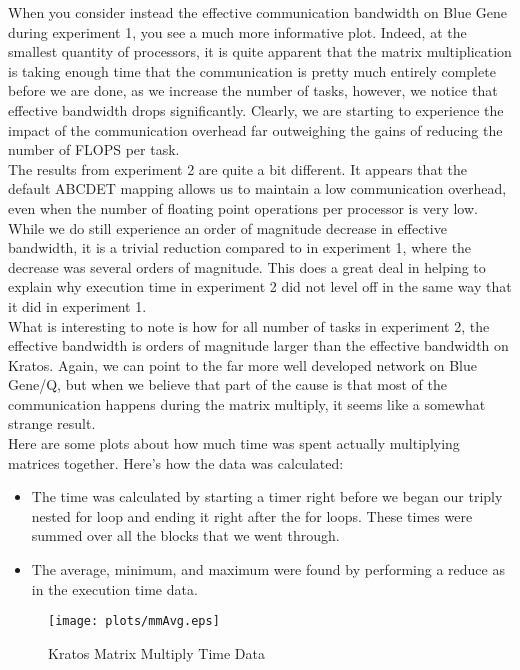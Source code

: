 \documentclass[twocolumn]{article}
\begin{document}
When you consider instead the effective communication bandwidth on Blue Gene 
during experiment 1, you see a much more informative plot. Indeed, at the smallest
quantity of processors, it is quite apparent that the matrix multiplication is 
taking enough time that the communication is pretty much entirely complete before
we are done, as we increase the number of tasks, however, we notice that effective
bandwidth drops significantly. Clearly, we are starting to experience the impact 
of the communication overhead far outweighing the gains of reducing the number of
FLOPS per task. \\

The results from experiment 2 are quite a bit different. It appears that the default
ABCDET mapping allows us to maintain a low communication overhead, even when the 
number of floating point operations per processor is very low. While we do still 
experience an order of magnitude decrease in effective bandwidth, it is a trivial
reduction compared to in experiment 1, where the decrease was several orders of 
magnitude. This does a great deal in helping to explain why execution time in 
experiment 2 did not level off in the same way that it did in experiment 1. \\

What is interesting to note is how for all number of tasks in experiment 2, the
effective bandwidth is orders of magnitude larger than the effective bandwidth on
Kratos. Again, we can point to the far more well developed network on Blue Gene/Q,
but when we believe that part of the cause is that most of the communication 
happens during the matrix multiply, it seems like a somewhat strange result. \\

Here are some plots about how much time was spent actually multiplying matrices
together. Here's how the data was calculated:
\begin{itemize}
\item The time was calculated by starting a timer right before we began our 
  triply nested for loop and ending it right after the for loops. These times 
  were summed over all the blocks that we went through. 
\item The average, minimum, and maximum were found by performing a reduce as 
  in the execution time data.
\end{itemize}

\begin{figure}
  \centering
  \texttt{[image: plots/mmAvg.eps]}
  \caption{Kratos Matrix Multiply Time Data}
\end{figure}
\end{document}
